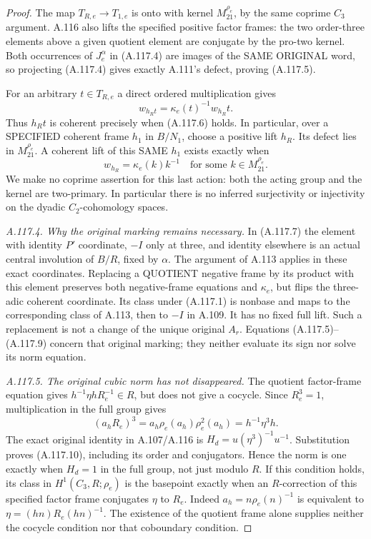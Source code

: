 \begin{proof}
The map \(T_{R,e}\to T_{1,e}\) is onto with kernel
\(M_{21}^{\rho_e}\), by the same coprime \(C_3\) argument.
A.116 also lifts the specified positive factor frames:
the two order-three elements above a given quotient element
are conjugate by the pro-two kernel.
Both occurrences of \(J_e^\alpha\) in (A.117.4) are images of
the SAME ORIGINAL word, so projecting (A.117.4) gives exactly
A.111's defect, proving (A.117.5).

For an arbitrary \(t\in T_{R,e}\) a direct ordered multiplication
gives
\[
                 w_{h_Rt}=\kappa_e(t)^{-1}w_{h_R}t.
 \tag{A.117.8}
\]
Thus \(h_Rt\) is coherent precisely when (A.117.6) holds.
In particular, over a SPECIFIED coherent frame \(h_1\) in \(B/N_1\),
choose a positive lift \(h_R\). Its defect lies in
\(M_{21}^{\rho_e}\). A coherent lift of this SAME \(h_1\) exists
exactly when
\[
 w_{h_R}=\kappa_e(k)k^{-1}
                 \quad\text{for some }k\in M_{21}^{\rho_e}.
 \tag{A.117.9}
\]
We make no coprime assertion for this last action: both the
acting group and the kernel are two-primary.
In particular there is no inferred surjectivity or injectivity
on the dyadic \(C_2\)-cohomology spaces.

\emph{A.117.4. Why the original marking remains necessary.}
In (A.117.7) the element with identity \(P'\) coordinate,
\(-I\) only at three, and identity elsewhere is an actual
central involution of \(B/R\), fixed by \(\alpha\).
The argument of A.113 applies in these exact coordinates.
Replacing a QUOTIENT negative frame by its product with this
element preserves both negative-frame equations and \(\kappa_e\),
but flips the three-adic coherent coordinate.
Its class under (A.117.1) is nonbase and maps to the corresponding
class of A.113, then to \(-I\) in A.109.
It has no fixed full lift. Such a replacement is not a change of
the unique original \(A_r\).
Equations (A.117.5)--(A.117.9) concern that original marking;
they neither evaluate its sign nor solve its norm equation.

\emph{A.117.5. The original cubic norm has not disappeared.}
The quotient factor-frame equation gives
\(h^{-1}\eta hR_e^{-1}\in R\), but does not give a cocycle.
Since \(R_e^3=1\), multiplication in the full group gives
\[
 (a_hR_e)^3=a_h\rho_e(a_h)\rho_e^2(a_h)
                         =h^{-1}\eta^3h.
\]
The exact original identity in A.107/A.116 is
\(H_d=u(\eta^3)^{-1}u^{-1}\).
Substitution proves (A.117.10), including its order and conjugators.
Hence the norm is one exactly when \(H_d=1\) in the full group,
not just modulo \(R\).
If this condition holds, its class in \(H^1(C_3,R;\rho_e)\)
is the basepoint exactly when an \(R\)-correction of this
specified factor frame conjugates \(\eta\) to \(R_e\).
Indeed \(a_h=n\rho_e(n)^{-1}\) is equivalent to
\(\eta=(hn)R_e(hn)^{-1}\).
The existence of the quotient frame alone supplies neither
the cocycle condition nor that coboundary condition.
\end{proof}

